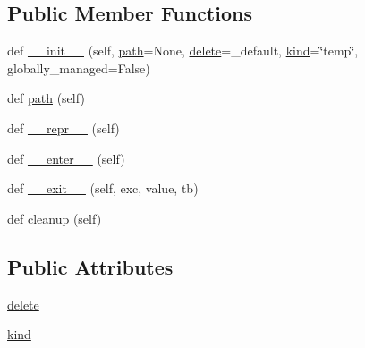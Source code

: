 \subsection*{Public Member Functions}
\begin{DoxyCompactItemize}
\item 
def \hyperlink{classpip_1_1__internal_1_1utils_1_1temp__dir_1_1TempDirectory_ab8977ab866889ed4df9d2965c4e9c496}{\+\_\+\+\_\+init\+\_\+\+\_\+} (self, \hyperlink{classpip_1_1__internal_1_1utils_1_1temp__dir_1_1TempDirectory_a4254ada0d1dd48d528785750384678e8}{path}=None, \hyperlink{classpip_1_1__internal_1_1utils_1_1temp__dir_1_1TempDirectory_a951c8f73bc5a1641a0114be38296e19a}{delete}=\+\_\+default, \hyperlink{classpip_1_1__internal_1_1utils_1_1temp__dir_1_1TempDirectory_afd9502a9ce40c538fd406e7f80562fde}{kind}=\char`\"{}temp\char`\"{}, globally\+\_\+managed=False)
\item 
def \hyperlink{classpip_1_1__internal_1_1utils_1_1temp__dir_1_1TempDirectory_a4254ada0d1dd48d528785750384678e8}{path} (self)
\item 
def \hyperlink{classpip_1_1__internal_1_1utils_1_1temp__dir_1_1TempDirectory_a26d453c441a425e881d085ca73f9e533}{\+\_\+\+\_\+repr\+\_\+\+\_\+} (self)
\item 
def \hyperlink{classpip_1_1__internal_1_1utils_1_1temp__dir_1_1TempDirectory_a191a67a9dcf2b815dfee2d2ffe902f3b}{\+\_\+\+\_\+enter\+\_\+\+\_\+} (self)
\item 
def \hyperlink{classpip_1_1__internal_1_1utils_1_1temp__dir_1_1TempDirectory_a2c52b40b2941dce70af3e8ce8e2fc394}{\+\_\+\+\_\+exit\+\_\+\+\_\+} (self, exc, value, tb)
\item 
def \hyperlink{classpip_1_1__internal_1_1utils_1_1temp__dir_1_1TempDirectory_a7a824e4ae2fd92d7f158affea644f137}{cleanup} (self)
\end{DoxyCompactItemize}
\subsection*{Public Attributes}
\begin{DoxyCompactItemize}
\item 
\hyperlink{classpip_1_1__internal_1_1utils_1_1temp__dir_1_1TempDirectory_a951c8f73bc5a1641a0114be38296e19a}{delete}
\item 
\hyperlink{classpip_1_1__internal_1_1utils_1_1temp__dir_1_1TempDirectory_afd9502a9ce40c538fd406e7f80562fde}{kind}
\end{DoxyCompactItemize}


